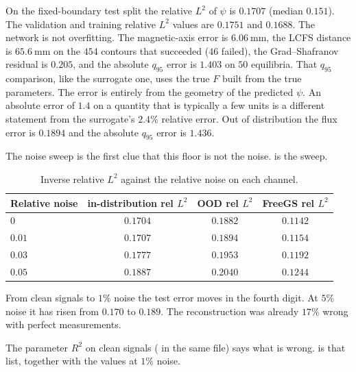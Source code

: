 \documentclass[11pt,a4paper,oneside,openany]{book}
\newcommand{\code}{\path}
\numberwithin{equation}{chapter}
\theoremstyle{definition}
\begin{document}
On the fixed-boundary test split the relative \(L^{2}\) of \(\psi\) is \(0.1707\) (median \(0.151\)). The validation and training relative \(L^{2}\) values are \(0.1751\) and \(0.1688\). The network is not overfitting. The magnetic-axis error is \(\qty{6.06}{\milli\metre}\), the LCFS distance is \(\qty{65.6}{\milli\metre}\) on the \(454\) contours that succeeded (\(46\) failed), the Grad--Shafranov residual is \(0.205\), and the absolute \(q_{95}\) error is \(1.403\) on \(50\) equilibria. That \(q_{95}\) comparison, like the surrogate one, uses the true \(F\) built from the true parameters. The error is entirely from the geometry of the predicted \(\psi\). An absolute error of \(1.4\) on a quantity that is typically a few units is a different statement from the surrogate's \(2.4\%\) relative error. Out of distribution the flux error is \(0.1894\) and the absolute \(q_{95}\) error is \(1.436\).

The noise sweep is the first clue that this floor is not the noise.  is the sweep.

\begin{table}[htbp]
\centering
\caption{Inverse relative \(L^{2}\) against the relative noise on each channel.}
\label{tab:noise}
\small
\begin{tabular}{@{}lccc@{}}
\toprule
Relative noise & in-distribution rel \(L^{2}\) & OOD rel \(L^{2}\) & FreeGS rel \(L^{2}\) \\
\midrule
\(0\) & \(0.1704\) & \(0.1882\) & \(0.1142\) \\
\(0.01\) & \(0.1707\) & \(0.1894\) & \(0.1154\) \\
\(0.03\) & \(0.1777\) & \(0.1953\) & \(0.1192\) \\
\(0.05\) & \(0.1887\) & \(0.2040\) & \(0.1244\) \\
\bottomrule
\end{tabular}
\end{table}

From clean signals to \(1\%\) noise the test error moves in the fourth digit. At \(5\%\) noise it has risen from \(0.170\) to \(0.189\). The reconstruction was already \(17\%\) wrong with perfect measurements.

The parameter \(R^{2}\) on clean signals (\code{param_r2_clean} in the same file) says what is wrong.  is that list, together with the values at \(1\%\) noise.
\end{document}
